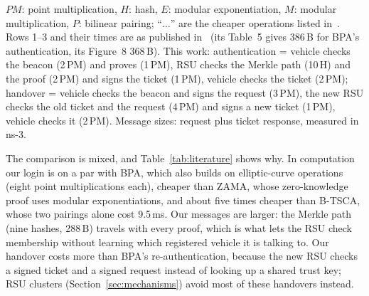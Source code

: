 \begin{table}[htbp]\centering\small\setlength{\tabcolsep}{4pt}
\caption{Cost of one authentication and one re-authentication (handover), priced with BPA's unit
costs (point multiplication 0.233\,ms, hash 0.0055\,ms, pairing 4.756\,ms)}\label{tab:literature}
\par\smallskip\parbox{\textwidth}{\scriptsize $\mathit{PM}$: point multiplication, $H$: hash, $E$: modular
exponentiation, $M$: modular multiplication, $P$: bilinear pairing; ``$\dots$'' are the cheaper
operations listed in~\cite{li2024bpa}. Rows 1--3 and their times are as published in~\cite{li2024bpa}
(its Table~5 gives 386\,B for BPA's authentication, its Figure~8 368\,B). This work: authentication
= vehicle checks the beacon (2\,PM) and proves (1\,PM), RSU checks the Merkle path (10\,H) and the
proof (2\,PM) and signs the ticket (1\,PM), vehicle checks the ticket (2\,PM); handover = vehicle
checks the beacon and signs the request (3\,PM), the new RSU checks the old ticket and the request
(4\,PM) and signs a new ticket (1\,PM), vehicle checks it (2\,PM). Message sizes: request plus
ticket response, measured in ns-3.}
\end{table}

The comparison is mixed, and Table~\ref{tab:literature} shows why. In computation our login is on a
par with BPA, which also builds on elliptic-curve operations (eight point multiplications each),
cheaper than ZAMA, whose zero-knowledge proof uses modular exponentiations, and about five times
cheaper than B-TSCA, whose two pairings alone cost 9.5\,ms. Our messages are larger: the Merkle path
(nine hashes, 288\,B) travels with every proof, which is what lets the RSU check membership without
learning which registered vehicle it is talking to. Our handover costs more than BPA's
re-authentication, because the new RSU checks a signed ticket and a signed request instead of
looking up a shared trust key; RSU clusters (Section~\ref{sec:mechanisms}) avoid most of these
handovers instead.

